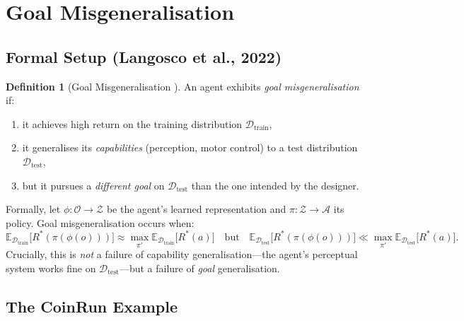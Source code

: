 \documentclass[11pt,a4paper]{article}
\theoremstyle{definition}
\newtheorem{definition}[theorem]{Definition}
\newcommand{\E}{\mathbb{E}}
\begin{document}
\section{Goal Misgeneralisation}\label{sec:goal_misgen}

\subsection{Formal Setup (Langosco et al., 2022)}

\begin{definition}[Goal Misgeneralisation \cite{langosco2022goal}]
An agent exhibits \emph{goal misgeneralisation} if:
\begin{enumerate}[label=(\roman*)]
  \item it achieves high return on the training distribution
    $\mathcal{D}_{\text{train}}$,
  \item it generalises its \emph{capabilities} (perception, motor
    control) to a test distribution $\mathcal{D}_{\text{test}}$,
  \item but it pursues a \emph{different goal} on
    $\mathcal{D}_{\text{test}}$ than the one intended by the designer.
\end{enumerate}
\end{definition}

Formally, let $\phi: \mathcal{O} \to \mathcal{Z}$ be the agent's
learned representation and $\pi: \mathcal{Z} \to \mathcal{A}$ its
policy. Goal misgeneralisation occurs when:
\begin{equation}\label{eq:goal_misgen}
  \E_{\mathcal{D}_{\text{train}}}\!\big[R^*(\pi(\phi(o)))\big]
  \approx \max_{\pi'} \E_{\mathcal{D}_{\text{train}}}\!\big[R^*(a)\big]
  \quad\text{but}\quad
  \E_{\mathcal{D}_{\text{test}}}\!\big[R^*(\pi(\phi(o)))\big]
  \ll \max_{\pi'} \E_{\mathcal{D}_{\text{test}}}\!\big[R^*(a)\big].
\end{equation}
Crucially, this is \emph{not} a failure of capability generalisation---the
agent's perceptual system works fine on $\mathcal{D}_{\text{test}}$---but
a failure of \emph{goal} generalisation.

\subsection{The CoinRun Example}
\end{document}
